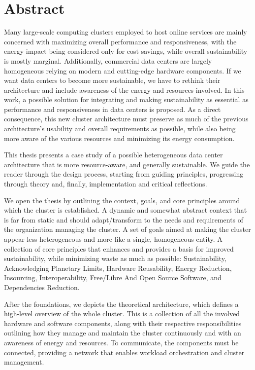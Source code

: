 \chapter*{Abstract}
\label{abtract}


Many large-scale computing clusters employed to host online services are mainly
concerned with maximizing overall performance and responsiveness, with the energy
impact being considered only for cost savings, while overall sustainability is
mostly marginal. Additionally, commercial data centers are largely homogeneous
relying on modern and cutting-edge hardware components. If we want data centers to
become more sustainable, we have to rethink their architecture and include
awareness of the energy and resources involved. In this work, a possible
solution for integrating and making sustainability as essential as performance
and responsiveness in data centers is proposed. As a direct consequence, this
new cluster architecture must preserve as much of the previous architecture's
usability and overall requirements as possible, while also being more aware of the
various resources and minimizing its energy consumption.

This thesis presents a case study of a possible heterogeneous data center architecture
that is more resource-aware, and generally sustainable. We guide the reader through
the design process, starting from guiding principles, progressing through theory
and, finally, implementation and critical reflections.

We open the thesis by outlining the context, goals, and core principles around which
the cluster is established. A dynamic and somewhat abstract context that is far
from static and should adapt/transform to the needs and requirements of the
organization managing the cluster. A set of goals aimed at making the cluster appear
less heterogeneous and more like a single, homogeneous entity. A collection of core
principles that enhances and provides a basis for improved sustainability, while
minimizing waste as much as possible: Sustainability, Acknowledging Planetary
Limits, Hardware Reusability, Energy Reduction, Insourcing, Interoperability, Free/Libre
And Open Source Software, and Dependencies Reduction.

After the foundations, we depicts the theoretical architecture, which defines a
high-level overview of the whole cluster. This is a collection of all the involved
hardware and software components, along with their respective responsibilities
outlining how they manage and maintain the cluster continuously and with an
awareness of energy and resources. To communicate, the components must be
connected, providing a network that enables workload orchestration and cluster management.

